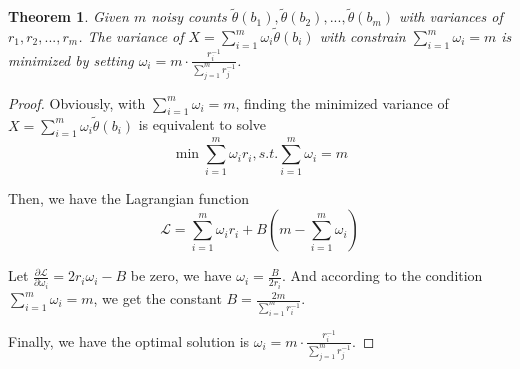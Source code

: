\documentclass[conference]{IEEEtran}
\newtheorem{theorem}{\bf Theorem}[section]
\newtheorem*{proof}{\text{$Proof.$}}
\begin{document}
\begin{theorem}\label{minimized noisy count}
Given $m$ noisy counts $\tilde{\theta}(b_1),\tilde{\theta}(b_2),...,\tilde{\theta}(b_m)$ with variances of $r_1,r_2,...,r_m$. The variance of $X = \sum_{i=1}^{m}\omega_i\tilde{\theta}(b_i)$ with constrain $\sum_{i=1}^{m}\omega_i = m$ is minimized by setting $\omega_i = m \cdot \frac{r_i^{-1} }{\sum_{j=1}^{m} r_j^{-1}}$.
\end{theorem}

\begin{proof}
Obviously, with $\sum_{i=1}^{m}\omega_i = m$, finding the minimized variance of $X = \sum_{i=1}^{m}\omega_i\tilde{\theta}(b_i)$ is equivalent to solve
\begin{equation}
\min{\sum_{i=1}^{m}\omega_i r_i , s.t. \sum_{i=1}^{m}\omega_i = m } \label{weigh mine}
\end{equation}

Then, we have the Lagrangian function
$$\mathcal{L} = \sum_{i=1}^{m}\omega_i r_i + B(m - \sum_{i=1}^{m}\omega_i)$$

Let $\frac{\partial {\mathcal{L}}}{ \partial{\omega_i}} = 2r_i \omega_i - B$ be zero, we have $\omega_i = \frac{B}{2r_i}$. And according to the condition $\sum_{i=1}^{m}\omega_i = m$, we get the constant $B = \frac{2m}{\sum_{i=1}^{m} r_i^{-1}}$.

Finally, we have the optimal solution is $\omega_i = m \cdot \frac{r_i^{-1} }{\sum_{j=1}^{m} r_j^{-1}}$.

\end{proof}
\end{document}
